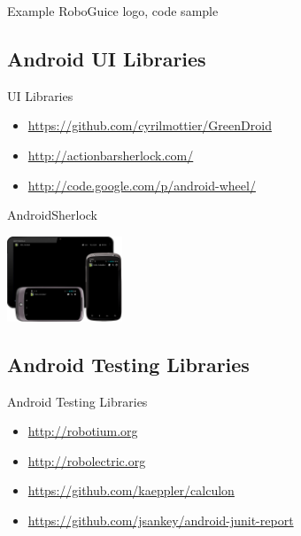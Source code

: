 \documentclass[aspectratio=169]{beamer}
\newcommand{\surl}[1] {{\tiny \url{#1}}}
\begin{document}
    \begin{frame}{Example RoboGuice}
      logo, code sample
    \end{frame}
  

  \subsection{Android UI Libraries}

    \begin{frame}{UI Libraries}
      \begin{itemize}
       \item<1->[GreenDroid] \surl{https://github.com/cyrilmottier/GreenDroid}
       \item<2->[ActionBarSherlock] \surl{http://actionbarsherlock.com/} 
       \item<3->[Android Wheel] \surl{http://code.google.com/p/android-wheel/}
      \end{itemize}
    \end{frame}

    \begin{frame}{AndroidSherlock}
      \begin{center}
      \includegraphics[height=1.0in]{androidsherlock.png}
      \end{center}
    \end{frame}

  \subsection{Android Testing Libraries}

    \begin{frame}{Android Testing Libraries}
      \begin{itemize}
        \item<1->[Robotium] \surl{http://robotium.org}
        \item<2->[Robolectric] \surl{http://robolectric.org}
        \item<3->[Calculon] \surl{https://github.com/kaeppler/calculon}
        \item<4->[Android JUnit Report] \surl{https://github.com/jsankey/android-junit-report}
      \end{itemize}
    \end{frame}
\end{document}
